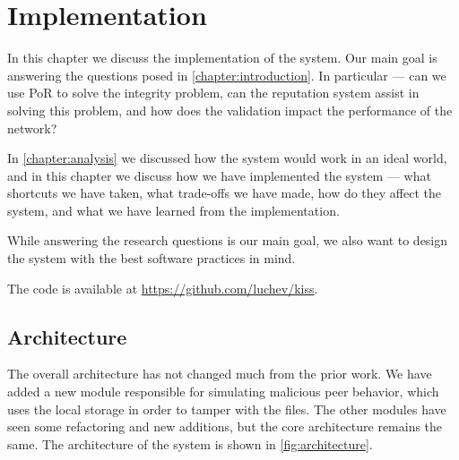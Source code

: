 \chapter{Implementation}
\label{chapter:implementation}

In this chapter we discuss the implementation of the system.
Our main goal is answering the questions posed in \autoref{chapter:introduction}.
In particular --- can we use PoR to solve the integrity problem,
can the reputation system assist in solving this problem,
and how does the validation impact the performance of the network?

In \autoref{chapter:analysis} we discussed how the system would work in an ideal world,
and in this chapter we discuss how we have implemented the system ---
what shortcuts we have taken, what trade-offs we have made,
how do they affect the system, and what we have learned from the implementation.

While answering the research questions is our main goal,
we also want to design the system with the best software practices in mind.

The code is available at \url{https://github.com/luchev/kiss}.

\section{Architecture}

The overall architecture has not changed much from the prior work.
We have added a new module responsible for simulating malicious peer behavior,
which uses the local storage in order to tamper with the files.
The other modules have seen some refactoring and new additions,
but the core architecture remains the same.
The architecture of the system is shown in \autoref{fig:architecture}.


